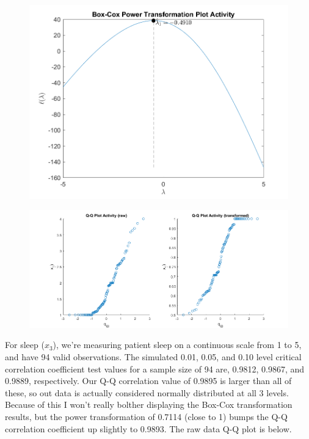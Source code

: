 \begin{center}
    \begin{figure}[H]
        \centering
        \includegraphics[scale=0.6]{./matlab/chapter-4/sol4.32.power.2.png}
    \end{figure}
\end{center}

\begin{center}
    \begin{figure}[H]
        \centering
        \includegraphics[scale=0.4]{./matlab/chapter-4/sol4.32.qq.2.png}
    \end{figure}
\end{center}

For sleep ($x_{3}$), we're measuring patient sleep on a continuous scale from 1 to 5, and have 94 valid observations. The simulated 0.01, 0.05, and 0.10 level critical correlation coefficient test values for a sample size of 94 are, 0.9812, 0.9867, and 0.9889, respectively. Our Q-Q correlation value of 0.9895 is larger than all of these, so out data is actually considered normally distributed at all 3 levels. Because of this I won't really bolther displaying the Box-Cox transformation results, but the power transformation of 0.7114 (close to 1) bumps the Q-Q correlation coefficient up slightly to 0.9893. The raw data Q-Q plot is below.

